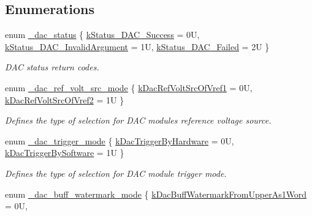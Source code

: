 \subsection*{Enumerations}
\begin{DoxyCompactItemize}
\item 
enum \hyperlink{group__dac__hal_gae46409393dc4005b88e984b043617361}{\+\_\+dac\+\_\+status} \{ \hyperlink{group__dac__hal_ggae46409393dc4005b88e984b043617361a107d715e40013a36e3ef04024a883287}{k\+Status\+\_\+\+D\+A\+C\+\_\+\+Success} = 0U, 
\hyperlink{group__dac__hal_ggae46409393dc4005b88e984b043617361acd62d1c11a4df0d745636ead838ee230}{k\+Status\+\_\+\+D\+A\+C\+\_\+\+Invalid\+Argument} = 1U, 
\hyperlink{group__dac__hal_ggae46409393dc4005b88e984b043617361a015a5b7abfb61d3b6f58329df578818e}{k\+Status\+\_\+\+D\+A\+C\+\_\+\+Failed} = 2U
 \}\begin{DoxyCompactList}\small\item\em D\+AC status return codes. \end{DoxyCompactList}
\item 
enum \hyperlink{group__dac__hal_ga807e13039d861140e500b031aed7d958}{\+\_\+dac\+\_\+ref\+\_\+volt\+\_\+src\+\_\+mode} \{ \hyperlink{group__dac__hal_gga807e13039d861140e500b031aed7d958a0fee11f625f37284ff247f194625c3be}{k\+Dac\+Ref\+Volt\+Src\+Of\+Vref1} = 0U, 
\hyperlink{group__dac__hal_gga807e13039d861140e500b031aed7d958a7ab48789024769b3391f0f7112228c67}{k\+Dac\+Ref\+Volt\+Src\+Of\+Vref2} = 1U
 \}\begin{DoxyCompactList}\small\item\em Defines the type of selection for D\+AC module\textquotesingle{}s reference voltage source. \end{DoxyCompactList}
\item 
enum \hyperlink{group__dac__hal_ga55c875a8ad0697b0220a2883303dc93a}{\+\_\+dac\+\_\+trigger\+\_\+mode} \{ \hyperlink{group__dac__hal_gga55c875a8ad0697b0220a2883303dc93aa5d7a824d79b072fde00e87a5bbc5ba4f}{k\+Dac\+Trigger\+By\+Hardware} = 0U, 
\hyperlink{group__dac__hal_gga55c875a8ad0697b0220a2883303dc93aa7295b1e04c139437fc16db750d969d96}{k\+Dac\+Trigger\+By\+Software} = 1U
 \}\begin{DoxyCompactList}\small\item\em Defines the type of selection for D\+AC module trigger mode. \end{DoxyCompactList}
\item 
enum \hyperlink{group__dac__hal_gaca326abf4ffaa1ea20eb364e519361a0}{\+\_\+dac\+\_\+buff\+\_\+watermark\+\_\+mode} \{ \hyperlink{group__dac__hal_ggaca326abf4ffaa1ea20eb364e519361a0ad18a75ca5ef7449e29a6ef368354595a}{k\+Dac\+Buff\+Watermark\+From\+Upper\+As1\+Word} = 0U, 

\end{DoxyCompactItemize}
